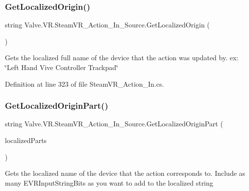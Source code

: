 \subsubsection{\texorpdfstring{GetLocalizedOrigin()}{GetLocalizedOrigin()}}
{\footnotesize\ttfamily string Valve.\+V\+R.\+Steam\+V\+R\+\_\+\+Action\+\_\+\+In\+\_\+\+Source.\+Get\+Localized\+Origin (\begin{DoxyParamCaption}{ }\end{DoxyParamCaption})}



Gets the localized full name of the device that the action was updated by. ex\+: \char`\"{}\+Left Hand Vive Controller Trackpad\char`\"{} 



Definition at line 323 of file Steam\+V\+R\+\_\+\+Action\+\_\+\+In.\+cs.

\mbox{\label{class_valve_1_1_v_r_1_1_steam_v_r___action___in___source_a3144a785d52f3a15cbdb72aa571c852b}} 
\subsubsection{\texorpdfstring{GetLocalizedOriginPart()}{GetLocalizedOriginPart()}}
{\footnotesize\ttfamily string Valve.\+V\+R.\+Steam\+V\+R\+\_\+\+Action\+\_\+\+In\+\_\+\+Source.\+Get\+Localized\+Origin\+Part (\begin{DoxyParamCaption}\item[{params \mbox{\hyperlink{namespace_valve_1_1_v_r_a05e76187bbc5846b9bfb44f6acf13912}{E\+V\+R\+Input\+String\+Bits}} \mbox{[}$\,$\mbox{]}}]{localized\+Parts }\end{DoxyParamCaption})}



Gets the localized name of the device that the action corresponds to. Include as many E\+V\+R\+Input\+String\+Bits as you want to add to the localized string 



